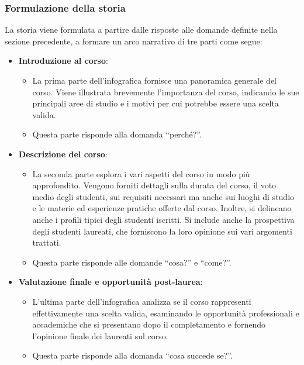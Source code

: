 \subsubsection{Formulazione della storia}\label{subsubsec:app_storia}
La storia viene formulata a partire dalle risposte alle domande definite nella sezione precedente, a formare un arco narrativo di tre parti come segue:
\begin{itemize}
    \item \textbf{Introduzione al corso}:
    \begin{itemize}
        \item La prima parte dell'infografica fornisce una panoramica generale del corso. Viene illustrata brevemente l'importanza del corso, indicando le sue principali aree di studio e 
        i motivi per cui potrebbe essere una scelta valida. 
        \item Questa parte risponde alla domanda ``perché?''.
    \end{itemize}
    \item \textbf{Descrizione del corso}:
    \begin{itemize}
        \item La seconda parte esplora i vari aspetti del corso in modo più approfondito. Vengono forniti dettagli sulla durata del corso, il voto medio degli studenti, sui requisiti necessari ma anche sui luoghi di studio e 
        le materie ed esperienze pratiche offerte dal corso. Inoltre, si delineano anche i profili tipici degli studenti iscritti.
        Si include anche la prospettiva degli studenti laureati, che forniscono la loro opinione sui vari argomenti trattati.
        \item Questa parte risponde alle domande ``cosa?'' e ``come?''.
    \end{itemize} 
    \item \textbf{Valutazione finale e opportunità post-laurea}:
    \begin{itemize}
        \item L'ultima parte dell'infografica analizza se il corso rappresenti effettivamente una scelta valida, esaminando le opportunità professionali e accademiche che si presentano dopo il completamento e fornendo 
        l'opinione finale dei laureati sul corso.
        \item Questa parte risponde alla domanda ``cosa succede se?''.
    \end{itemize}
\end{itemize}

